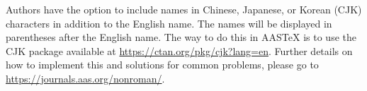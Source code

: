 \documentclass[linenumbers,amsmath,trackchanges]{aastex702}
\begin{document}
Authors have the option to include names in Chinese, Japanese, or Korean (CJK)
characters in addition to the English name. The names will be displayed
in parentheses after the English name. The way to do this in AASTeX is to
use the CJK package available at \url{https://ctan.org/pkg/cjk?lang=en}.
Further details on how to implement this and solutions for common problems,
please go to \url{https://journals.aas.org/nonroman/}.


{}



\end{document}
